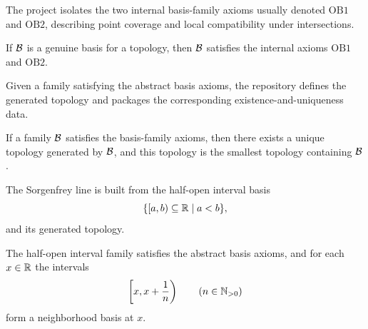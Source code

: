 \begin{definition}\label{def:basis-family-3-9}
\leanok
The project isolates the two internal basis-family axioms usually denoted $\mathrm{OB1}$ and $\mathrm{OB2}$, describing point coverage and local compatibility under intersections.
\end{definition}

\begin{proposition}\label{prop:basis-properties-3-9}
\leanok
If $\mathcal{B}$ is a genuine basis for a topology, then $\mathcal{B}$ satisfies the internal axioms $\mathrm{OB1}$ and $\mathrm{OB2}$.
\end{proposition}

\begin{definition}\label{def:topology-from-basis-3-10}
\leanok
Given a family satisfying the abstract basis axioms, the repository defines the generated topology and packages the corresponding existence-and-uniqueness data.
\end{definition}

\begin{proposition}\label{prop:basis-generated-topology-3-10-3-11}
\leanok
If a family $\mathcal{B}$ satisfies the basis-family axioms, then there exists a unique topology generated by $\mathcal{B}$, and this topology is the smallest topology containing $\mathcal{B}$.
\end{proposition}

\begin{definition}\label{def:sorgenfrey-3-12}
\leanok
The Sorgenfrey line is built from the half-open interval basis
\[
\{[a,b)\subseteq\mathbb{R} \mid a<b\},
\]
and its generated topology.
\end{definition}

\begin{proposition}\label{prop:sorgenfrey-basis-3-12}
\leanok
The half-open interval family satisfies the abstract basis axioms, and for each $x\in\mathbb{R}$ the intervals
\[
\left[x, x+\frac{1}{n}\right)
\qquad (n\in\mathbb{N}_{>0})
\]
form a neighborhood basis at $x$.
\end{proposition}

